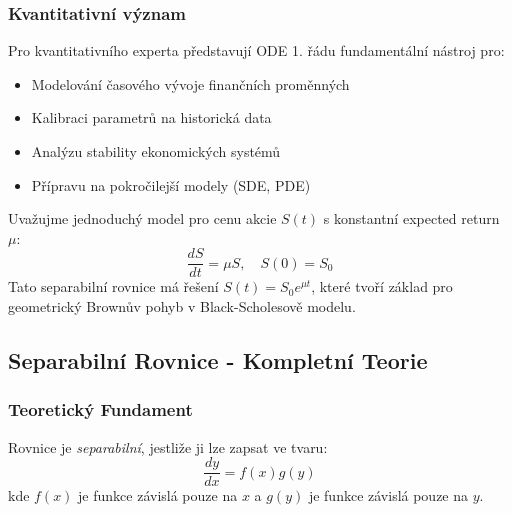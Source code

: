 \subsubsection*{Kvantitativní význam}

Pro kvantitativního experta představují ODE 1. řádu fundamentální nástroj pro:

\begin{itemize}
\item Modelování časového vývoje finančních proměnných
\item Kalibraci parametrů na historická data
\item Analýzu stability ekonomických systémů
\item Přípravu na pokročilejší modely (SDE, PDE)
\end{itemize}

\vspace{0.8\baselineskip}

\begin{example}
Uvažujme jednoduchý model pro cenu akcie $S(t)$ s konstantní expected return $\mu$:
\[
\frac{dS}{dt} = \mu S, \quad S(0) = S_0
\]
Tato separabilní rovnice má řešení $S(t) = S_0 e^{\mu t}$, které tvoří základ pro geometrický Brownův pohyb v Black-Scholesově modelu.
\end{example}

\vspace{0.8\baselineskip}

\subsection{Separabilní Rovnice - Kompletní Teorie}


\label{subsec:separabilni-rovnice}

\subsubsection{Teoretický Fundament}
\label{subsubsec:teoreticky-fundament}

\begin{definition}
Rovnice je \emph{separabilní}, jestliže ji lze zapsat ve tvaru:
\[
\frac{dy}{dx} = f(x)g(y)
\]
kde $f(x)$ je funkce závislá pouze na $x$ a $g(y)$ je funkce závislá pouze na $y$.
\end{definition}

\vspace{0.6\baselineskip}


